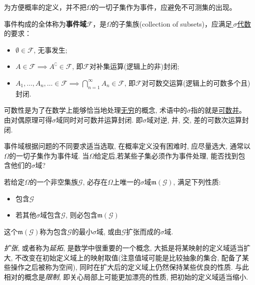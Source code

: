 为方便概率的定义，并不把$\Omega$的一切子集作为事件，应避免不可测集的出现。

\begin{definition}[事件域]
    事件构成的全体称为\textbf{事件域}$\mathscr{F}$，是$\Omega$的子集族(collection of subsets)，应满足\underline{\,$\sigma$代数}的要求：
    \begin{itemize}
        \item $\emptyset \in \mathscr{F}$, 无事发生;
        \item $A\in\mathscr{F} \implies A^{\complement}\in\mathscr{F}$, 即$\mathscr{F}$对补集运算(逻辑上的非)封闭;
        \item $A_{1},\dots,A_{n},\ldots \in \mathscr{F} \implies \bigcap_{n=1}^{\infty}A_{n} \in \mathscr{F}$, 即$\mathscr{F}$对可数交运算(逻辑上的可数多个且)封闭.
    \end{itemize}
\end{definition}

\begin{note}
    可数性是为了在数学上能够恰当地处理\underline{无穷}的概念, 术语中的$\sigma$指的就是\underline{可数并}。由对偶原理可得$\sigma$域同时对可数并运算封闭. 即$\sigma$域对逆, 并, 交, 差的可数次运算封闭.
\end{note}

事件域根据问题的不同要求适当选取, 在概率定义没有困难时, 应尽量选大, 通常以$\Omega$的一切子集作为事件域. 当$\Omega$给定后,若某些子集必须作为事件处理, 能否找到包含他们的$\sigma$域?

\begin{proposition}
    若给定$\Omega$的一个非空集族$\mathscr{G}$, 必存在$\Omega$上唯一的$\sigma$域$\mathfrak{m}(\mathscr{G})$, 满足下列性质:
    \begin{itemize}
        \item 包含$\mathscr{G}$
        \item 若其他$\sigma$域包含$\mathscr{G}$, 则必包含$\mathfrak{m}(\mathscr{G})$
    \end{itemize}
    这个$\mathfrak{m}(\mathscr{G})$称为包含$\mathscr{G}$的最小$\sigma$域, 或由$\mathscr{G}$扩张而成的$\sigma$域.
\end{proposition}

\emph{扩张}, 或者称为\emph{延拓}, 是数学中很重要的一个概念, 大抵是将某映射的定义域适当扩大, 不改变在初始定义域上的映射取值(注意值域可能是比较抽象的集合, 配备了某些操作之后被称为空间), 同时在扩大后的定义域上仍然保持某些优良的性质. 与此相对的概念是\emph{限制}, 即关心局部上可能更加漂亮的性质, 把初始的定义域适当缩小.

